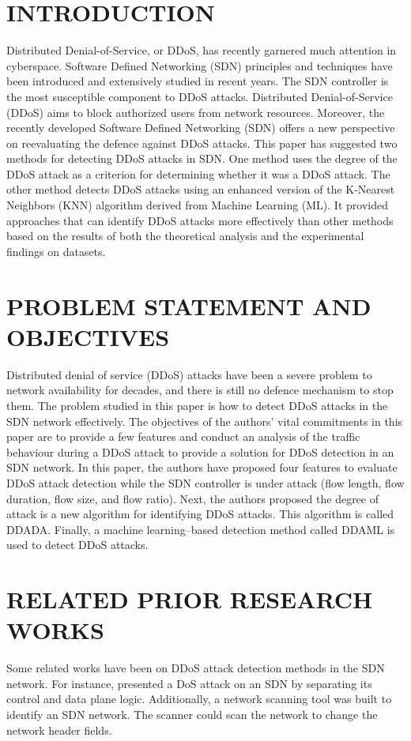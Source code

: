 \documentclass[12pt]{report}
\begin{document}
\section{INTRODUCTION}
Distributed Denial-of-Service, or DDoS, has recently garnered much attention in cyberspace. Software Defined Networking (SDN) principles and techniques have been introduced and extensively studied in recent years. The SDN controller is the most susceptible component to DDoS attacks. Distributed Denial-of-Service (DDoS) aims to block authorized users from network resources. Moreover, the recently developed Software Defined Networking (SDN) offers a new perspective on reevaluating the defence against DDoS attacks. This paper has suggested two methods for detecting DDoS attacks in SDN. One method uses the degree of the DDoS attack as a criterion for determining whether it was a DDoS attack. The other method detects DDoS attacks using an enhanced version of the K-Nearest Neighbors (KNN) algorithm derived from Machine Learning (ML). It provided approaches that can identify DDoS attacks more effectively than other methods based on the results of both the theoretical analysis and the experimental findings on datasets.

\section{PROBLEM STATEMENT AND OBJECTIVES}
Distributed denial of service (DDoS) attacks have been a severe problem to network availability for decades, and there is still no defence mechanism to stop them. The problem studied in this paper is how to detect DDoS attacks in the SDN network effectively. The objectives of the authors’ vital commitments in this paper are to provide a few features and conduct an analysis of the traffic behaviour during a DDoS attack to provide a solution for DDoS detection in an SDN network. In this paper, the authors have proposed four features to evaluate DDoS attack detection while the SDN controller is under attack (flow length, flow duration, flow size, and flow ratio). Next, the authors proposed the degree of attack is a new algorithm for identifying DDoS attacks. This algorithm is called DDADA. Finally, a machine learning–based detection method called DDAML is used to detect DDoS attacks.

\section{RELATED PRIOR RESEARCH WORKS}
Some related works have been on DDoS attack detection methods in the SDN network. For instance, \cite{Shin}  presented a DoS attack on an SDN by separating its control and data plane logic.  Additionally, a network scanning tool was built to identify an SDN network. The scanner could scan the network to change the network header fields. 
\end{document}

